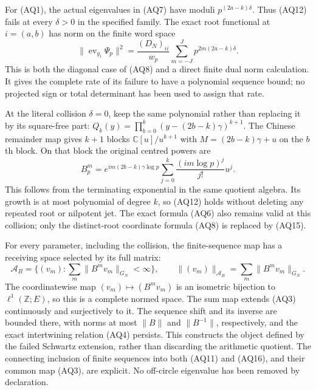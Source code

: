 \documentclass[11pt,a4paper]{article}
\theoremstyle{definition}\newtheorem{definition}[theorem]{Definition}
\begin{document}
For (AQ1), the actual eigenvalues in (AQ7) have moduli
$p^{(2a-k)\delta}$. Thus (AQ12) fails at every $\delta>0$ in the
specified family. The exact root functional at $i=(a,b)$ has norm on
the finite word space
\[
 \|\operatorname{ev}_{y_i}\Psi_p\|^2
   =\frac{(D_N)_{ii}}{w_p}
           \sum_{m=-J}^Jp^{2m(2a-k)\delta}.
 \tag{AQ14}
\]
This is both the diagonal case of (AQ8) and a direct finite dual norm
calculation. It gives the complete rate of its failure to have a
polynomial sequence bound; no projected sign or total determinant
has been used to assign that rate.

At the literal collision $\delta=0$, keep the same polynomial rather
than replacing it by its square-free part:
$Q_k(y)=\prod_{b=0}^k(y-(2b-k)\gamma)^{k+1}$.
The Chinese remainder map gives $k+1$ blocks
$\mathbb C[u]/u^{k+1}$ with $M=(2b-k)\gamma+u$ on the $b$th block.
On that block the original centred powers are
\[
 B_p^m=e^{im(2b-k)\gamma\log p}
       \sum_{j=0}^{k}\frac{(im\log p)^j}{j!}u^j.
 \tag{AQ15}
\]
This follows from the terminating exponential in the same quotient
algebra. Its growth is at most polynomial of degree $k$, so (AQ12)
holds without deleting any repeated root or nilpotent jet. The exact
formula (AQ6) also remains valid at this collision; only the
distinct-root coordinate formula (AQ8) is replaced by (AQ15).

For every parameter, including the collision, the finite-sequence map
has a receiving space selected by its full matrix:
\[
 \mathscr A_B=\{(v_m):\sum_m\|B^m v_m\|_{G_N}<\infty\},
 \qquad\|(v_m)\|_{\mathscr A_B}=\sum_m\|B^m v_m\|_{G_N}.
 \tag{AQ16}
\]
The coordinatewise map $(v_m)\mapsto(B^m v_m)$ is an isometric
bijection to $\ell^1(\mathbb Z;E)$, so this is a complete normed
space. The sum map extends (AQ3) continuously and surjectively to it.
The sequence shift and its inverse are bounded there, with norms at
most $\|B\|$ and $\|B^{-1}\|$, respectively, and the exact
intertwining relation (AQ4) persists. This constructs the object
defined by the failed Schwartz extension, rather than discarding
the arithmetic quotient. The connecting inclusion of finite
sequences into both (AQ11) and (AQ16), and their common map (AQ3),
are explicit. No off-circle eigenvalue has been removed by declaration.
\end{document}
